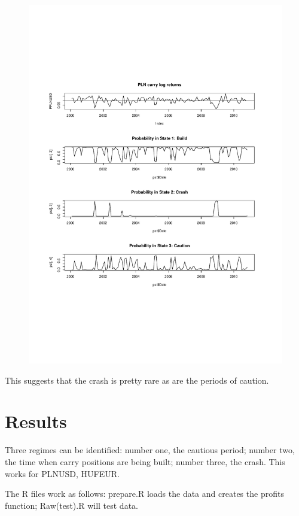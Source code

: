 \documentclass[12pt, a4paper, oneside]{article} %
\begin{document}
\begin{figure}[h]
\centering
\includegraphics[scale = .80]{../Figures/PLNUSD.pdf}
\end{figure}

This suggests that the crash is pretty rare as are the periods of caution. 



\section{Results}
Three regimes can be identified: number one, the cautious period; number two, the time when carry positions are being built; number three, the crash.  This works for PLNUSD, HUFEUR. 

The R files work as follows: prepare.R loads the data and creates the profits function; Raw(test).R will test data. 
\end{document}
